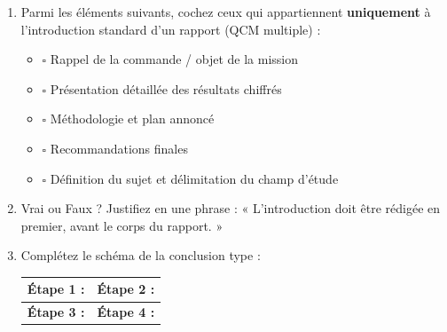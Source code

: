 \documentclass[11pt]{article}
\begin{document}
\begin{exercice}
\begin{enumerate}
    \item Parmi les éléments suivants, cochez ceux qui appartiennent \textbf{uniquement} à l'introduction standard d'un rapport (QCM multiple) :
    \begin{itemize}
        \item[] $\square$ Rappel de la commande / objet de la mission
        \item[] $\square$ Présentation détaillée des résultats chiffrés
        \item[] $\square$ Méthodologie et plan annoncé
        \item[] $\square$ Recommandations finales
        \item[] $\square$ Définition du sujet et délimitation du champ d'étude
    \end{itemize}
    \item Vrai ou Faux ? Justifiez en une phrase : « L'introduction doit être rédigée en premier, avant le corps du rapport. »
    \item Complétez le schéma de la conclusion type :
    \begin{center}
    \begin{tabular}{|p{5cm}|p{5cm}|}
    \hline
    \textbf{Étape 1 :} \underline{\hspace{4.5cm}} & \textbf{Étape 2 :} \underline{\hspace{4.5cm}} \\
    \hline
    \textbf{Étape 3 :} \underline{\hspace{4.5cm}} & \textbf{Étape 4 :} \underline{\hspace{4.5cm}} \\
    \hline
    \end{tabular}
    \end{center}
\end{enumerate}
\end{exercice}
\end{document}
